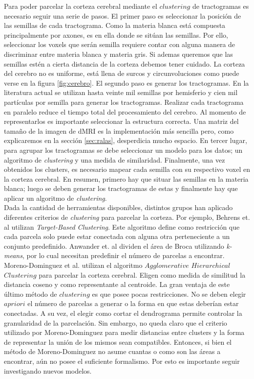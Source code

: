 Para poder parcelar la corteza cerebral mediante el $clustering$ de 
tractogramas es necesario seguir una serie de pasos. El primer paso es
seleccionar la posici\'on de las semillas de cada tractograma. Como la
materia blanca est\'a compuesta principalmente por axones, es en ella
donde se sit\'uan las semillas. Por ello, seleccionar los voxels que 
ser\'an semilla requiere contar con alguna manera de discriminar
entre materia blanca y materia gris. Si ademas queremos que las
semillas est\'en a cierta distancia de la corteza debemos tener cuidado.
La corteza del cerebro no es uniforme, est\'a llena de surcos y 
circunvoluciones como puede verse en la figura \ref{fig:cerebro}.
El segundo paso es generar los tractogramas. En la literatura actual se
utilizan hasta veinte mil semillas por hemisferio 
\cite{Moreno-Dominguez2014} y cien mil part\'iculas por semilla 
\cite{Anwander2006} para generar los tractogramas. Realizar cada
tractograma en paralelo reduce el tiempo total del procesamiento del
cerebro. Al momento de representarlos es importante seleccionar la
estructura correcta. Una matriz del tama\~no de la imagen de dMRI es la
implementaci\'on m\'as sencilla pero, como explicaremos en la secci\'on 
\ref{sec:ralas}, desperdicia mucho espacio. En tercer lugar, para agrupar
los tractogramas se debe seleccionar un modelo para los datos; un
algoritmo de \textit{clustering} y una medida de similaridad. Finalmente,
una vez obtenidos los clusters, es necesario mapear cada semilla con su
respectivo voxel en la corteza cerebral. En resumen, primero hay 
que situar las semillas en la materia blanca; luego se deben generar los 
tractogramas de estas y finalmente hay que aplicar un algoritmo de
\textit{clustering}. \\
 
Dada la cantidad de herramientas disponibles, distintos grupos han
aplicado diferentes criterios de \textit{clustering} para parcelar la
corteza. Por ejemplo, Behrens et. al \cite{Behrens2003} utilizan 
\textit{Target-Based Clustering}. Este algoritmo define como restricci\'on
que cada parcela solo puede estar conectada con alguna otra perteneciente
a un conjunto predefinido. Anwander et. al \cite{Anwander2006} dividen el
\'area de Broca utilizando \textit{k-means}, por lo cual necesitan 
predefinir el n\'umero de parcelas a encontrar. Moreno-Dominguez et al. 
\cite{Moreno-Dominguez2014} utilizan el algoritmo $Agglomerative$
$Hierarchical$ $Clustering$ para parcelar la corteza cerebral. Eligen 
como medida de similitud la distancia coseno y como representante al
centroide. La gran ventaja de este \'ultimo m\'etodo de $clustering$ es
que posee pocas restricciones. No se deben elegir $a priori$ el n\'umero
de parcelas a generar o la forma en que estas deber\'ian estar conectadas.
A su vez, el elegir como cortar el dendrograma permite controlar la
granularidad de la parcelaci\'on. Sin embargo, no queda claro
que el criterio utilizado por Moreno-Dominguez para medir distancias entre
clusters y la forma de representar la uni\'on de los mismos sean
compatibles. Entonces, si bien el m\'etodo de Moreno-Dominguez no asume
cuantas o como son las \'areas a encontrar, a\'un no posee el suficiente
formalismo. Por esto es importante seguir investigando nuevos modelos.  \\

